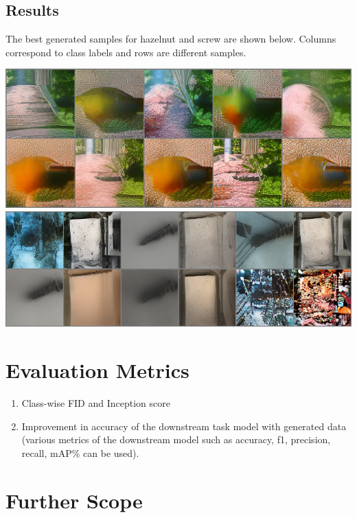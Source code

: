 \documentclass[]{article}
\begin{document}
\subsection{Results}
The best generated samples for hazelnut and screw are shown below. Columns correspond to class labels and rows are different samples.\\ 
\begin{center}
\includegraphics[scale=0.2]{hazelnut}\\
\includegraphics[scale=0.2]{screw}\\
\end{center}
\section{Evaluation Metrics}
\begin{enumerate}
	\item  Class-wise FID and Inception score
	\item Improvement in accuracy of the downstream task model with generated data (various metrics of the downstream model such as accuracy, f1, precision, recall, mAP\@x\% can be used).  
\end{enumerate}
\section{Further Scope}
\end{document}
